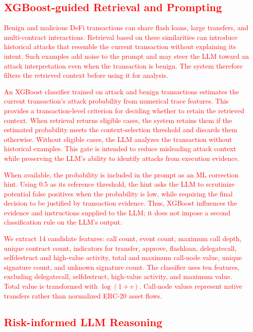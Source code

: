 \subsection{\textcolor{red}{XGBoost-guided Retrieval and Prompting}}
\label{sec:xgb-guidance}

\textcolor{red}{Benign and malicious DeFi transactions can share flash loans, large transfers, and multi-contract interactions. Retrieval based on these similarities can introduce historical attacks that resemble the current transaction without explaining its intent. Such examples add noise to the prompt and may steer the LLM toward an attack interpretation even when the transaction is benign. The system therefore filters the retrieved context before using it for analysis.}

\textcolor{red}{An XGBoost classifier trained on attack and benign transactions estimates the current transaction's attack probability from numerical trace features. This provides a transaction-level criterion for deciding whether to retain the retrieved context. When retrieval returns eligible cases, the system retains them if the estimated probability meets the context-selection threshold and discards them otherwise. Without eligible cases, the LLM analyzes the transaction without historical examples. This gate is intended to reduce misleading attack context while preserving the LLM's ability to identify attacks from execution evidence.}

\textcolor{red}{When available, the probability is included in the prompt as an ML correction hint. Using 0.5 as its reference threshold, the hint asks the LLM to scrutinize potential false positives when the probability is low, while requiring the final decision to be justified by transaction evidence. Thus, XGBoost influences the evidence and instructions supplied to the LLM; it does not impose a second classification rule on the LLM's output.}

\textcolor{red}{We extract 14 candidate features: call count, event count, maximum call depth, unique contract count, indicators for transfer, approve, flashloan, delegatecall, selfdestruct and high-value activity, total and maximum call-node value, unique signature count, and unknown signature count. The classifier uses ten features, excluding delegatecall, selfdestruct, high-value activity, and maximum value. Total value is transformed with $\log(1+v)$. Call-node values represent native transfers rather than normalized ERC-20 asset flows.}

\subsection{\textcolor{red}{Risk-informed LLM Reasoning}}

